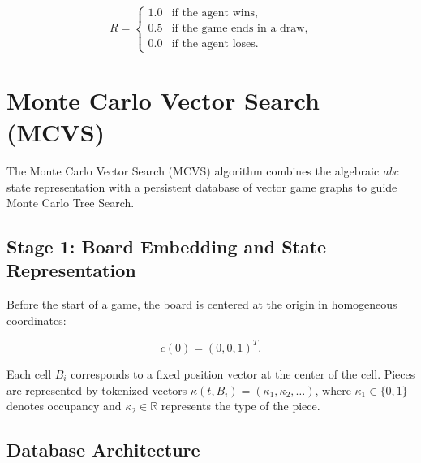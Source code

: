 \documentclass[11pt,a4paper]{article}
\theoremstyle{plain}
\theoremstyle{definition}
\begin{document}
\[
R =
\begin{cases}
1.0 & \text{if the agent wins}, \\
0.5 & \text{if the game ends in a draw}, \\
0.0 & \text{if the agent loses}.
\end{cases}
\]

\vspace{0.5em}


\vspace{0.5em}

\section{Monte Carlo Vector Search (MCVS)}

\vspace{0.5em}

The Monte Carlo Vector Search (MCVS) algorithm combines the algebraic \emph{abc} state representation with a persistent database of vector game graphs to guide Monte Carlo Tree Search.

\vspace{0.5em}

\subsection{Stage 1: Board Embedding and State Representation}

\vspace{0.5em}

Before the start of a game, the board is centered at the origin in homogeneous coordinates:

\vspace{0.5em}

\[
c(0) = (0,0,1)^T.
\]

\vspace{0.5em}

Each cell \(B_i\) corresponds to a fixed position vector at the center of the cell. Pieces are represented by tokenized vectors \(\kappa(t, B_i) = (\kappa_1, \kappa_2, \dots)\), where \(\kappa_1 \in \{0,1\}\) denotes occupancy and \(\kappa_2 \in \mathbb{R}\) represents the type of the piece.

\vspace{0.5em}

\subsection{Database Architecture}
\end{document}
